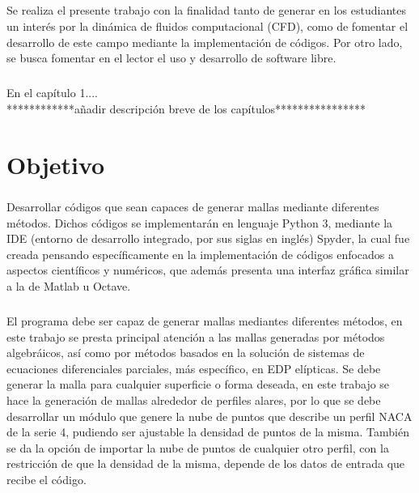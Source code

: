 \documentclass[letterpaper, openright, 12pt]{book}
\begin{document}
	\paragraph*{}
		Se realiza el presente trabajo con la finalidad tanto de generar en los estudiantes un interés por la dinámica de fluidos computacional (CFD), como de fomentar el desarrollo de este campo mediante la implementación de códigos. Por otro lado, se busca fomentar en el lector el uso y desarrollo de software libre.

	\paragraph*{}
		En el capítulo 1....\\************añadir descripción breve de los capítulos****************




	\chapter*{Objetivo}
	
	\paragraph*{}
	Desarrollar códigos que sean capaces de generar mallas mediante diferentes métodos. Dichos códigos se implementarán en lenguaje Python 3, mediante la IDE (entorno de desarrollo integrado, por sus siglas en inglés) Spyder, la cual fue creada pensando específicamente en la implementación de códigos enfocados a aspectos científicos y numéricos, 	que además presenta una interfaz gráfica similar a la de Matlab u Octave.
		
	\paragraph*{}
		El programa debe ser capaz de generar  mallas mediantes diferentes métodos, en este trabajo se presta principal atención a las mallas generadas por métodos algebráicos, así como por métodos basados en la solución de sistemas de ecuaciones diferenciales parciales, más específico, en EDP elípticas. Se debe generar la malla para cualquier superficie o forma deseada, en este trabajo se hace la generación de mallas alrededor de perfiles alares, por lo que se debe desarrollar un módulo que genere la nube de puntos que describe un perfil NACA de la serie 4, pudiendo ser ajustable la densidad de puntos de la misma. También se da la opción de importar la nube de puntos de cualquier otro perfil, con la restricción de que la densidad de la misma, depende de los datos de entrada que recibe el código.
	
\end{document}
